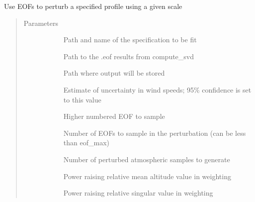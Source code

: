 \documentclass[letterpaper,10pt,english]{sphinxmanual}
\begin{document}
\begin{fulllineitems}
\label{\detokenize{stochprop.eofs:stochprop.eofs.perturb_atmo}}
Use EOFs to perturb a specified profile using a given scale
\begin{quote}\begin{description}
\item[{Parameters}] \leavevmode\begin{description}
\item[{}] \leavevmode
Path and name of the specification to be fit

\item[{}] \leavevmode
Path to the .eof results from compute\_svd

\item[{}] \leavevmode
Path where output will be stored

\item[{}] \leavevmode
Estimate of uncertainty in wind speeds; 95\% confidence is set to this value

\item[{}] \leavevmode
Higher numbered EOF to sample

\item[{}] \leavevmode
Number of EOFs to sample in the perturbation (can be less than eof\_max)

\item[{}] \leavevmode
Number of perturbed atmospheric samples to generate

\item[{}] \leavevmode
Power raising relative mean altitude value in weighting

\item[{}] \leavevmode
Power raising relative singular value in weighting

\end{description}

\end{description}\end{quote}

\end{fulllineitems}
\end{document}

